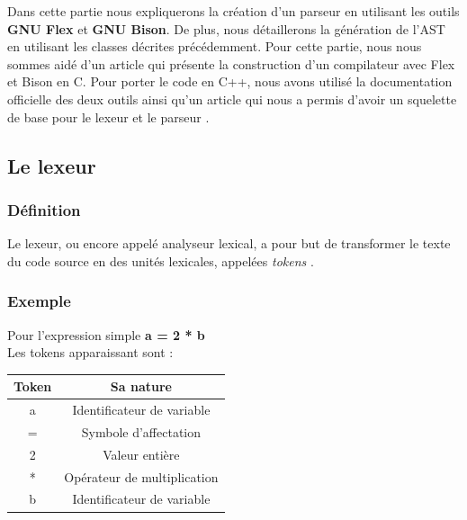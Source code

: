 \documentclass[a4paper]{article}%
\begin{document}

Dans cette partie nous expliquerons la création d'un parseur en utilisant les
outils \textbf{GNU Flex} et \textbf{GNU Bison}. De plus, nous détaillerons la
génération de l'AST en utilisant les classes décrites précédemment. Pour cette
partie, nous nous sommes aidé d'un article \cite{compilerFlexBison} qui présente
la construction d'un compilateur avec Flex et Bison en C. Pour porter le code en %
C++, nous avons utilisé la documentation officielle des deux outils ainsi qu'un
article qui nous a permis d'avoir un squelette de base pour le lexeur et le
parseur \cite{cppparsing}.

\subsection{Le lexeur}%

\subsubsection{Définition}

Le lexeur, ou encore appelé analyseur lexical, a pour but de transformer le
texte du code source en des unités lexicales, appelées \textit{tokens}
\cite{flexBisonHandbook}. \\

\subsubsection{Exemple}

Pour l'expression simple \textbf{a = 2 * b} \\
Les tokens apparaissant sont : \\
\begin{center}
  \begin{tabular}{ | c | c | }
    \hline
    \textbf{Token} & \textbf{Sa nature} \\
    \hline
    a & Identificateur de variable \\
    \hline
    = & Symbole d'affectation \\
    \hline
    2 & Valeur entière \\
    \hline
    * & Opérateur de multiplication \\
    \hline
    b & Identificateur de variable \\
    \hline
  \end{tabular}
\end{center}
\end{document}
